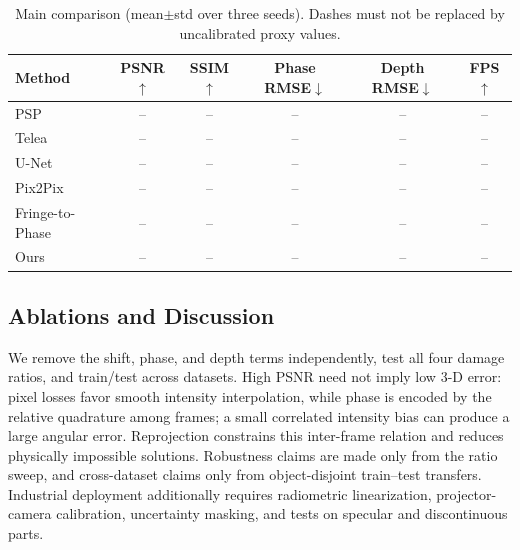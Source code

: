 \begin{table}[t]
\centering
\caption{Main comparison (mean$\pm$std over three seeds). Dashes must not be
replaced by uncalibrated proxy values.}
\begin{tabular}{lccccc}
\hline
Method & PSNR$\uparrow$ & SSIM$\uparrow$ & Phase RMSE$\downarrow$
& Depth RMSE$\downarrow$ & FPS$\uparrow$\\ \hline
PSP & -- & -- & -- & -- & --\\
Telea & -- & -- & -- & -- & --\\
U-Net & -- & -- & -- & -- & --\\
Pix2Pix & -- & -- & -- & -- & --\\
Fringe-to-Phase & -- & -- & -- & -- & --\\
Ours & -- & -- & -- & -- & --\\ \hline
\end{tabular}
\end{table}

\subsection{Ablations and Discussion}
We remove the shift, phase, and depth terms independently, test all four damage
ratios, and train/test across datasets. High PSNR need not imply low 3-D error:
pixel losses favor smooth intensity interpolation, while phase is encoded by
the relative quadrature among frames; a small correlated intensity bias can
produce a large angular error. Reprojection constrains this inter-frame
relation and reduces physically impossible solutions. Robustness claims are
made only from the ratio sweep, and cross-dataset claims only from
object-disjoint train--test transfers. Industrial deployment additionally
requires radiometric linearization, projector-camera calibration, uncertainty
masking, and tests on specular and discontinuous parts.
